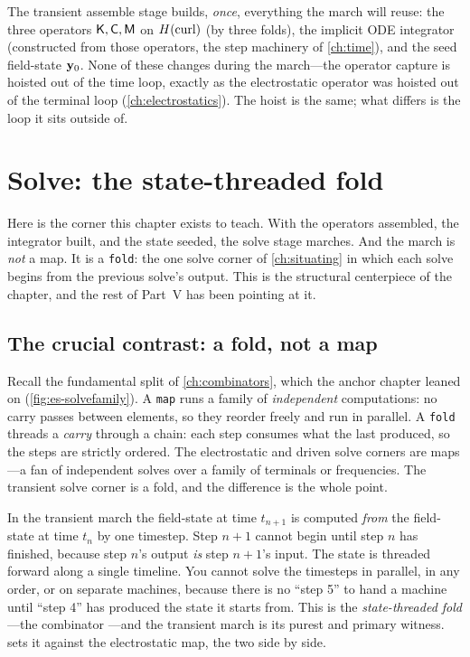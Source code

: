 \begin{keyidea}
The transient assemble stage builds, \emph{once}, everything the march will reuse:
the three operators $\mathsf{K},\mathsf{C},\mathsf{M}$ on $H(\mathrm{curl})$ (by three 
folds), the implicit ODE integrator (constructed from those operators, the step
machinery of \cref{ch:time}), and the seed field-state $\mathbf{y}_0$. None of these
changes during the march---the operator capture is hoisted out of the time loop,
exactly as the electrostatic operator was hoisted out of the terminal loop
(\cref{ch:electrostatics}). The hoist is the same; what differs is the loop it sits
outside of.
\end{keyidea}

\section{Solve: the state-threaded fold}
\label{sec:tr-solve}

Here is the corner this chapter exists to teach. With the operators assembled, the
integrator built, and the state seeded, the solve stage marches. And the march is
\emph{not} a map. It is a \texttt{fold}: the one solve corner of \cref{ch:situating}
in which each solve begins from the previous solve's output. This is the structural
centerpiece of the chapter, and the rest of Part~V has been pointing at it.

\subsection{The crucial contrast: a fold, not a map}

Recall the fundamental split of \cref{ch:combinators}, which the anchor chapter
leaned on (\cref{fig:es-solvefamily}). A \texttt{map} runs a family of
\emph{independent} computations: no carry passes between elements, so they
reorder freely and run in parallel. A \texttt{fold} threads a \emph{carry} through
a chain: each step consumes what the last produced, so the steps are strictly
ordered. The electrostatic and driven solve corners are maps---a fan of
independent solves over a family of terminals or frequencies. The transient solve
corner is a fold, and the difference is the whole point.

In the transient march the field-state at time $t_{n+1}$ is computed \emph{from}
the field-state at time $t_n$ by one timestep. Step $n+1$ cannot begin until step
$n$ has finished, because step $n$'s output \emph{is} step $n+1$'s input. The state
is threaded forward along a single timeline. You cannot solve the timesteps in
parallel, in any order, or on separate machines, because there is no ``step 5'' to
hand a machine until ``step 4'' has produced the state it starts from. This is the
\emph{state-threaded fold}---the combinator ---and the transient
march is its purest and primary witness.  sets it against the
electrostatic map, the two side by side.

